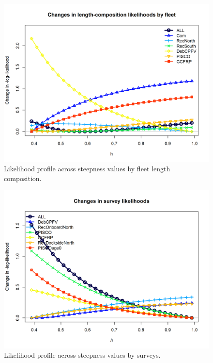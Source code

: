 \documentclass[12pt,]{article}
\begin{document}
\begin{figure}
\centering
\includegraphics{Figures/profile_h_piner.png}
\caption{Likelihood profile across steepness values by fleet length
composition. \label{fig:profile_h_piner}}
\end{figure}

\FloatBarrier

\begin{figure}
\centering
\includegraphics{Figures/profile_h_piner2.png}
\caption{Likelihood profile across steepness values by surveys.
\label{fig:profile_h_piner2}}
\end{figure}

\FloatBarrier
\end{document}
